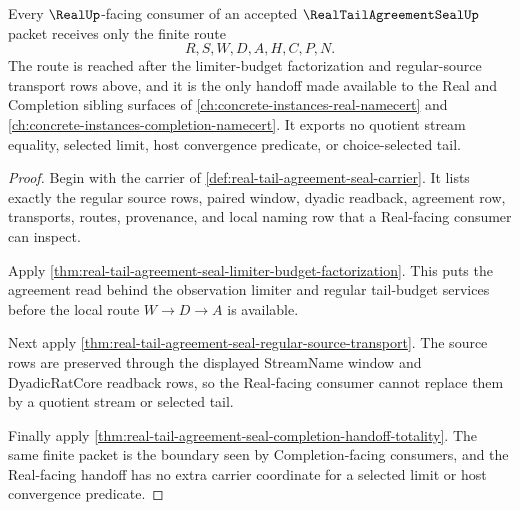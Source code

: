 \begin{theorem}
\label{thm:real-tail-agreement-seal-real-handoff-exhaustion}
Every $\RealUp$-facing consumer of an accepted $\RealTailAgreementSealUp$ packet receives only the finite route
$$
R,S,W,D,A,H,C,P,N.
$$
The route is reached after the limiter-budget factorization and regular-source transport rows above, and it is the only handoff made available to the Real and Completion sibling surfaces of \autoref{ch:concrete-instances-real-namecert} and \autoref{ch:concrete-instances-completion-namecert}. It exports no quotient stream equality, selected limit, host convergence predicate, or choice-selected tail.
\end{theorem}
\begin{proof}
Begin with the carrier of \autoref{def:real-tail-agreement-seal-carrier}. It lists exactly the regular source rows, paired window, dyadic readback, agreement row, transports, routes, provenance, and local naming row that a Real-facing consumer can inspect.

Apply \autoref{thm:real-tail-agreement-seal-limiter-budget-factorization}. This puts the agreement read behind the observation limiter and regular tail-budget services before the local route $W \to D \to A$ is available.

Next apply \autoref{thm:real-tail-agreement-seal-regular-source-transport}. The source rows are preserved through the displayed StreamName window and DyadicRatCore readback rows, so the Real-facing consumer cannot replace them by a quotient stream or selected tail.

Finally apply \autoref{thm:real-tail-agreement-seal-completion-handoff-totality}. The same finite packet is the boundary seen by Completion-facing consumers, and the Real-facing handoff has no extra carrier coordinate for a selected limit or host convergence predicate.
\end{proof}

